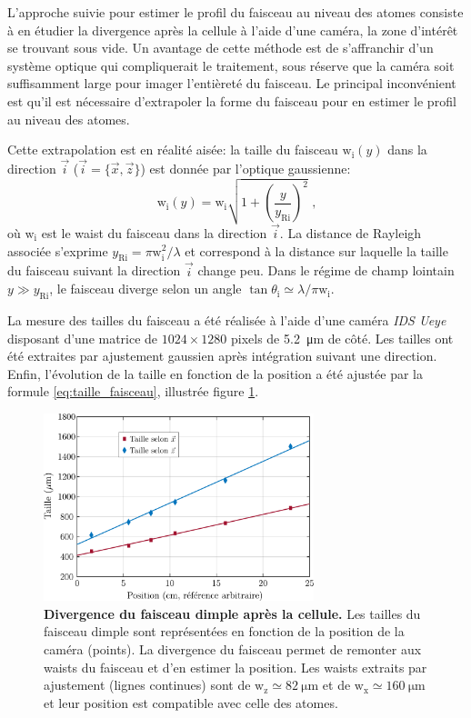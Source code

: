 L'approche suivie pour estimer le profil du faisceau au niveau des atomes consiste à en étudier la divergence après la cellule à l'aide d'une caméra, la zone d'intérêt se trouvant sous vide. Un avantage de cette méthode est de s'affranchir d'un système optique qui compliquerait le traitement, sous réserve que la caméra soit suffisamment large pour imager l'entièreté du faisceau. Le principal inconvénient est qu'il est nécessaire d'extrapoler la forme du faisceau pour en estimer le profil au niveau des atomes.

Cette extrapolation est en réalité aisée: la taille du faisceau $\mathrm{w}_{\mathrm{i}}(y)$ dans la direction $\vec{i}$ ($\vec{i}= \lbrace \vec{x},\vec{z} \rbrace$) est donnée par l'optique gaussienne:
\begin{equation}
\mathrm{w}_{\mathrm{i}}(y)=\mathrm{w}_{\mathrm{i}} \sqrt{1+\left( \frac{y}{y_{\mathrm{Ri}}} \right)^2} \text{ ,}
\label{eq:taille_faisceau}
\end{equation}
où $\mathrm{w}_{\mathrm{i}}$ est le waist du faisceau dans la direction $\vec{i}$. La distance de Rayleigh associée s'exprime $y_{\mathrm{Ri}}=\pi \mathrm{w}_{\mathrm{i}}^2 / \lambda$ et correspond à la distance sur laquelle la taille du faisceau suivant la direction $\vec{i}$ change peu. Dans le régime de champ lointain $y \gg y_{\mathrm{Ri}}$, le faisceau diverge selon un angle $\tan \theta_{\mathrm{i}} \simeq \lambda / \pi \mathrm{w}_{\mathrm{i}}$.

La mesure des tailles du faisceau a été réalisée à l'aide d'une caméra \emph{IDS Ueye} disposant d'une matrice de $1024 \times 1280$ pixels de \SI{5.2}{\micro\metre} de côté. Les tailles ont été extraites par ajustement gaussien après intégration suivant une direction. Enfin, l'évolution de la taille en fonction de la position a été ajustée par la formule \ref{eq:taille_faisceau}, illustrée figure \ref{fig:taille_dimple}.

\begin{figure}
\centering
\includegraphics[width=0.7\textwidth]{Fig/Modif_exp/expansion_dimple.pdf}
\caption{\textbf{Divergence du faisceau dimple après la cellule.} Les tailles du faisceau dimple sont représentées en fonction de la position de la caméra (points). La divergence du faisceau permet de remonter aux waists du faisceau et d'en estimer la position. Les waists extraits par ajustement (lignes continues) sont de $\mathrm{w_z}\simeq \SI{82}{\micro\metre}$ et de $\mathrm{w_x}\simeq \SI{160}{\micro\metre}$ et leur position est compatible avec celle des atomes.}
\label{fig:taille_dimple}
\end{figure}

